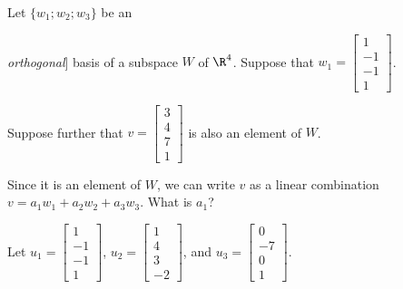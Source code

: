 Let $\{w_1; w_2; w_3\}$ be an {\emph{orthogonal}] basis of a subspace $W$ of $\R^4$.  
Suppose that 
$w_1 = \left[ \begin{array}{c} 1 \\ -1 \\ -1 \\ 1 \end{array} \right]$.  

Suppose further that $v = \left[ \begin{array}{c} 3 \\ 4 \\ 7 \\ 1 \end{array} \right]$ is also 
an element of $W$.   

Since it is an element of $W$, we can write $v$ as a 
linear combination $v = a_1 w_1 + a_2 w_2 + a_3w_3$.  
What is $a_1$?  





\endedxproblem


\endedxvertical








Let $u_1 = \left[ \begin{array}{c} 1 \\ -1 \\ -1 \\ 1 \end{array} \right]$,
$u_2 = \left[ \begin{array}{c} 1 \\ 4 \\ 3 \\ -2 \end{array} \right]$,
and $u_3 = \left[ \begin{array}{c} 0 \\ -7 \\ 0 \\ 1 \end{array} \right]$.  

}
